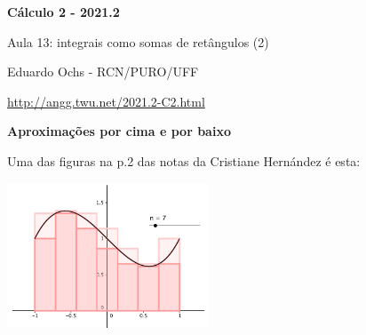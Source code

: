 \documentclass[oneside,12pt]{article}
\begin{document}
\def\Intxover     #1#2#3{\overline {∫}_{x=#1}^{x=#2}#3\,dx}
\def\Intxunder    #1#2#3{\underline{∫}_{x=#1}^{x=#2}#3\,dx}

\def\Intoverunder   #1#2{\overline{\underline{∫}}_{#1}      #2\,dx}
\def\Intxoverunder#1#2#3{\overline{\underline{∫}}_{x=#1}^{x=#2} #3\,dx}


%

\thispagestyle{empty}

\begin{center}

\vspace*{1.2cm}

{\bf \Large Cálculo 2 - 2021.2}

\bsk

Aula 13: integrais como somas de retângulos (2)

\bsk

Eduardo Ochs - RCN/PURO/UFF

\url{http://angg.twu.net/2021.2-C2.html}

\end{center}

\newpage


{\bf Aproximações por cima e por baixo}

Uma das figuras na p.2 das notas da Cristiane Hernández é esta:


\includegraphics[width=6cm]{2020-1-C2/area-hernandez-1.png}
\end{document}
